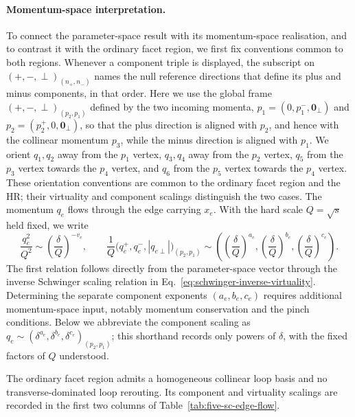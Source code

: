 \documentclass[a4paper,11pt]{article}
\begin{document}
\paragraph{Momentum-space interpretation.}
To connect the parameter-space result with its momentum-space realisation,
and to contrast it with the ordinary facet region, we first fix conventions
common to both regions.  Whenever a component triple is displayed, the
subscript on \((+,-,\perp)_{(n_+,n_-)}\) names the null reference directions
that define its plus and minus components, in that order.  Here we use the
global frame \((+,-,\perp)_{(p_2,p_1)}\) defined by the two incoming momenta,
\(p_1=(0,p_1^-,\boldsymbol 0_\perp)\) and
\(p_2=(p_2^+,0,\boldsymbol 0_\perp)\),
so that the plus direction is aligned with \(p_2\), and hence with the
collinear momentum \(p_3\), while the minus direction is aligned with
\(p_1\).
We orient \(q_1,q_2\) away from the \(p_1\) vertex, \(q_3,q_4\) away
from the \(p_2\) vertex, \(q_5\) from the \(p_3\) vertex towards the
\(p_4\) vertex, and \(q_6\) from the \(p_5\) vertex towards the \(p_4\)
vertex.  These orientation conventions are common to the ordinary facet
region and the HR; their virtuality and component scalings distinguish the
two cases.  The momentum \(q_e\) flows through the edge carrying \(x_e\).
With the hard scale \(Q=\sqrt{s}\) held fixed, we write
\[
 \frac{q_e^2}{Q^2}\sim
 \left(\frac{\delta}{Q}\right)^{-v_e},
 \qquad
 \frac{1}{Q}\bigl(q_e^+,q_e^-,|q_{e\perp}|\bigr)_{(p_2,p_1)}
 \sim
 \left(\left(\frac{\delta}{Q}\right)^{a_e},
       \left(\frac{\delta}{Q}\right)^{b_e},
       \left(\frac{\delta}{Q}\right)^{c_e}\right).
\]
The first relation follows directly from the parameter-space vector through
the inverse Schwinger scaling relation in
Eq.~\eqref{eq:schwinger-inverse-virtuality}.  Determining the separate
component exponents \((a_e,b_e,c_e)\) requires additional momentum-space
input, notably momentum conservation and the pinch conditions.  Below we
abbreviate the component scaling as
\(q_e\sim(\delta^{a_e},\delta^{b_e},\delta^{c_e})_{(p_2,p_1)}\); this shorthand records
only powers of \(\delta\), with the fixed factors of \(Q\) understood.

The ordinary facet region admits a homogeneous collinear loop basis and no
transverse-dominated loop rerouting.  Its component and virtuality scalings
are recorded in the first two columns of Table~\ref{tab:five-sc-edge-flow}.
\end{document}
